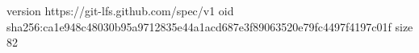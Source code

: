 version https://git-lfs.github.com/spec/v1
oid sha256:ca1e948c48030b95a9712835e44a1acd687e3f89063520e79fc4497f4197c01f
size 82
